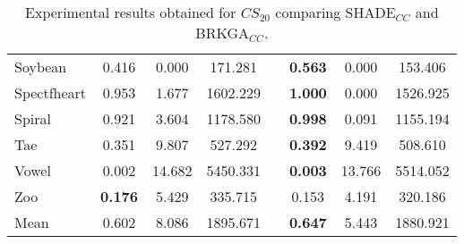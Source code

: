 \begin{table}[!h]
{\begin{tabular}{l ccc c ccc}
			Soybean & 0.416 & 0.000 & 171.281 && \textbf{0.563} & 0.000 & 153.406 \\
			Spectfheart & 0.953 & 1.677 & 1602.229 && \textbf{1.000} & 0.000 & 1526.925 \\
			Spiral & 0.921 & 3.604 & 1178.580 && \textbf{0.998} & 0.091 & 1155.194 \\
			Tae & 0.351 & 9.807 & 527.292 && \textbf{0.392} & 9.419 & 508.610 \\
			Vowel & 0.002 & 14.682 & 5450.331 && \textbf{0.003} & 13.766 & 5514.052 \\
			Zoo & \textbf{0.176} & 5.429 & 335.715 && 0.153 & 4.191 & 320.186 \\
			\hline
			Mean & 0.602 & 8.086 & 1895.671 && \textbf{0.647} & 5.443 & 1880.921 \\
			\hline
			
	\end{tabular}}
	
	\caption{Experimental results obtained for $CS_{20}$ comparing SHADE$_{CC}$ and BRKGA$_{CC}$.}
	\label{tab:results20}
\end{table}


